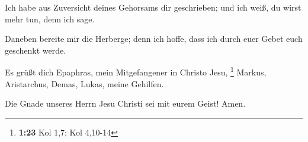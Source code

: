  Ich habe aus Zuversicht deines Gehorsams dir geschrieben;
und ich weiß, du wirst mehr tun, denn ich sage.

 Daneben bereite mir die Herberge; denn ich hoffe, dass ich
durch euer Gebet euch geschenkt werde.

 Es grüßt dich Epaphras, mein Mitgefangener in Christo
Jesu, \footnote{\textbf{1:23} Kol 1,7; Kol 4,10-14} 
Markus, Aristarchus, Demas, Lukas, meine Gehilfen.

 Die Gnade unseres Herrn Jesu Christi sei mit eurem Geist!
Amen.
